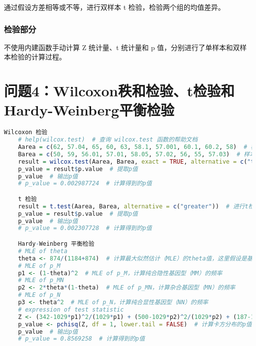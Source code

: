 \documentclass[UTF8]{report}
\theoremstyle{MyLineTheoremStyle} %
\theoremstyle{MyBlockTheoremStyle} %
\theoremstyle{MySubsubsectionStyle} %
\begin{document}
通过假设方差相等或不等，进行双样本 t 检验，检验两个组的均值差异。

\subsection*{检验部分}

不使用内建函数手动计算 Z 统计量、t 统计量和 p 值，分别进行了单样本和双样本检验的计算过程。














\chapter{问题4：Wilcoxon秩和检验、t检验和Hardy-Weinberg平衡检验}

\begin{lstlisting}[language=R]
    Wilcoxon 检验
    # help(wilcox.test)  # 查询 wilcox.test 函数的帮助文档
    Aarea = c(62, 57.04, 65, 60, 63, 58.1, 57.001, 60.1, 60.2, 58)  # 样本A数据
    Barea = c(50, 59, 56.01, 57.01, 58.05, 57.02, 56, 55, 57.03)  # 样本B数据
    result = wilcox.test(Aarea, Barea, exact = TRUE, alternative = c("two.sided"))  # 进行Wilcoxon秩和检验（双尾检验）
    p_value = result$p.value  # 提取p值
    p_value  # 输出p值
    # p_value = 0.002987724  # 计算得到的p值

    t 检验
    result = t.test(Aarea, Barea, alternative = c("greater"))  # 进行t检验（单尾检验，假设样本A的均值大于样本B的均值）
    p_value = result$p.value  # 提取p值
    p_value  # 输出p值
    # p_value = 0.002307728  # 计算得到的p值

    Hardy-Weinberg 平衡检验
    # MLE of theta
    theta <- 874/(1184+874)  # 计算最大似然估计（MLE）的theta值，这里假设是基因型频率
    # MLE of p_M
    p1 <- (1-theta)^2  # MLE of p_M，计算纯合隐性基因型（MM）的频率
    # MLE of p_MN
    p2 <- 2*theta*(1-theta)  # MLE of p_MN，计算杂合基因型（MN）的频率
    # MLE of p_N
    p3 <- theta^2  # MLE of p_N，计算纯合显性基因型（NN）的频率
    # expression of test statistic
    Z <- (342-1029*p1)^2/(1029*p1) + (500-1029*p2)^2/(1029*p2) + (187-1029*p3)^2/(1029*p3)  # 计算卡方检验统计量
    p_value <- pchisq(Z, df = 1, lower.tail = FALSE)  # 计算卡方分布的p值，df=1是自由度
    p_value  # 输出p值
    # p_value = 0.8569258  # 计算得到的p值


  
\end{lstlisting}
\end{document}
